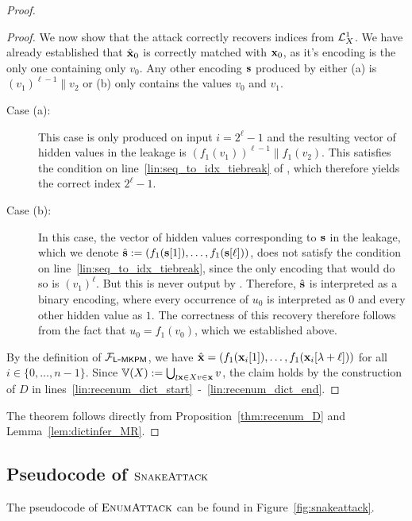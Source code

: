\begin{proof}
\begin{proof}
	We now show that the attack correctly recovers indices from $\mathcal{L}^{1}_X$. 
	We have already established that $\hat{\mathbf{x}}_0$ is correctly matched with $\mathbf{x}_0$,
	as it's encoding is the only one containing only $v_0$. 
	Any other encoding $\mathbf{s}$ produced by \IdxToSeq{}
	either (a) is $(v_1)^{\ell - 1} \| v_2$ or (b) only
	contains the values $v_0$ and $v_1$.
	\begin{description}
	\item[Case (a):] This case is only produced on input $i = 2^\ell - 1$ and the resulting vector of hidden values in the 	
		 leakage is $(f_1(v_1))^{\ell - 1} \| f_1(v_2)$. 
		 This satisfies the condition on line~\ref{lin:seq_to_idx_tiebreak} of \SeqToIdx{}, 
		 which therefore yields the correct index $2^\ell - 1$.
	\item[Case (b):] In this case, the vector of hidden values corresponding to $\mathbf{s}$ in the leakage, which we denote
		$\hat{\mathbf{s}}:=(f_1(\mathbf{s}[1]),\allowbreak\dots,f_1(\mathbf{s}[\ell]))$, does not satisfy the condition on line~\ref{lin:seq_to_idx_tiebreak}, 
		since the only encoding that would do so is $(v_1)^{\ell}$. 
		But this is never output by \IdxToSeq{}. 
		Therefore, $\hat{\mathbf{s}}$ is interpreted as a binary encoding, where every occurrence of $u_0$ 
		is interpreted as $0$ and every other hidden value as $1$.
		The correctness of this recovery therefore follows from the fact that $u_0 = f_1(v_0)$,
		which we established above.
	\end{description}
	
	By the definition of $\mathcal{F}_{\mathsf{L\mbox{-}MKPM}}$, we have $\hat{\mathbf{x}} = (f_1(\mathbf{x}_i[1]), \dots, f_1(\mathbf{x}_i[\lambda+\ell]))$ for all $i \in \{0, \dots, n-1\}$.
	Since $\Ispace[X] := \bigcup_{\substack{l}{\bx\in X\\v \in \bx}} v$, 
	the claim holds by the construction of $D$ in lines~\ref{lin:recenum_dict_start}~-~\ref{lin:recenum_dict_end}.
\end{proof}
	
	The theorem follows directly from Proposition~\ref{thm:recenum_D} and Lemma~\ref{lem:dictinfer_MR}.
\end{proof}

\subsection{Pseudocode of $\textsc{SnakeAttack}$}
\label{sec:snakeattack:pseudocode}

The pseudocode of $\textsc{EnumAttack}$ can be found in Figure~\ref{fig:snakeattack}.



